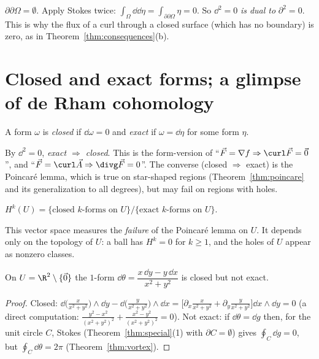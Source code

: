 \begin{example}
$\partial\partial\Omega=\emptyset$. Apply Stokes twice: $\int_\Omega\dd\dd\eta=\int_{\partial\partial\Omega}\eta=0$. So $\dd^2=0$ \emph{is dual to} $\partial^2=0$. This is why the flux of a curl through a closed surface (which has no boundary) is zero, as in Theorem~\ref{thm:consequences}(b).
\end{example}

\section{Closed and exact forms; a glimpse of de Rham cohomology}

\begin{definition}
A form $\omega$ is \emph{closed} if $\dd\omega=0$ and \emph{exact} if $\omega=\dd\eta$ for some form $\eta$.
\end{definition}

By $\dd^2=0$, \emph{exact $\Rightarrow$ closed}. This is the form-version of ``$\vec F=\nabla f\Rightarrow\curl\vec F=\vec0$'', and ``$\vec F=\curl\vec A\Rightarrow\divg\vec F=0$''. The converse (closed $\Rightarrow$ exact) is the Poincar\'e lemma, which is true on star-shaped regions (Theorem~\ref{thm:poincare} and its generalization to all degrees), but may fail on regions with holes.

\begin{definition}
$H^k(U)=\{\text{closed }k\text{-forms on }U\}\big/\{\text{exact }k\text{-forms on }U\}$.
\end{definition}

This vector space measures the \emph{failure} of the Poincar\'e lemma on $U$. It depends only on the topology of $U$: a ball has $H^k=0$ for $k\ge1$, and the holes of $U$ appear as nonzero classes.

\begin{theorem}\label{thm:H1}
On $U=\R^2\setminus\{\vec0\}$ the $1$-form $\dd\theta=\dfrac{x\,\dd y-y\,\dd x}{x^2+y^2}$ is closed but not exact.
\end{theorem}

\begin{proof}
Closed: $\dd\bigl(\frac{x}{x^2+y^2}\bigr)\wedge\dd y-\dd\bigl(\frac{y}{x^2+y^2}\bigr)\wedge\dd x=\bigl[\partial_x\frac x{x^2+y^2}+\partial_y\frac y{x^2+y^2}\bigr]\dd x\wedge\dd y=0$ (a direct computation: $\frac{y^2-x^2}{(x^2+y^2)^2}+\frac{x^2-y^2}{(x^2+y^2)^2}=0$). Not exact: if $\dd\theta=\dd g$ then, for the unit circle $C$, Stokes (Theorem~\ref{thm:special}(1) with $\partial C=\emptyset$) gives $\oint_C\dd g=0$, but $\oint_C\dd\theta=2\pi$ (Theorem~\ref{thm:vortex}).
\end{proof}

